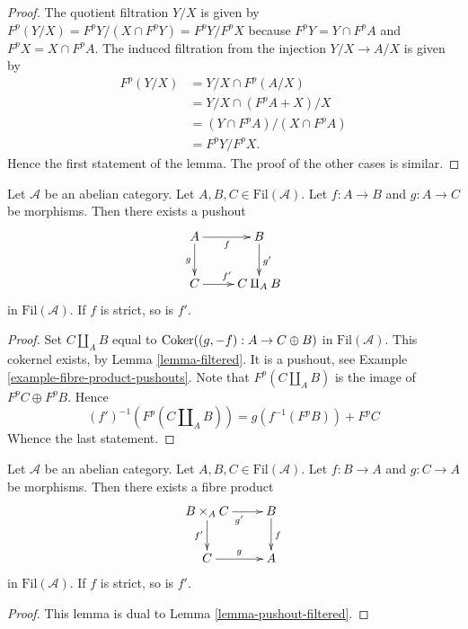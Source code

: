 \begin{proof}
The quotient filtration $Y/X$ is given by
$F^p(Y/X) = F^pY/(X \cap F^pY) = F^pY/F^pX$
because $F^pY = Y \cap F^pA$ and $F^pX = X \cap F^pA$.
The induced filtration from the injection $Y/X \to A/X$ is given by
\begin{align*}
F^p(Y/X) & = Y/X \cap F^p(A/X) \\
& = Y/X \cap (F^pA + X)/X \\
& = (Y \cap F^pA)/(X \cap F^pA) \\
& = F^pY/F^pX.
\end{align*}
Hence the first statement of the lemma.
The proof of the other cases is similar.
\end{proof}

\begin{lemma}
\label{lemma-pushout-filtered}
Let $\mathcal{A}$ be an abelian category.
Let $A, B, C \in \text{Fil}(\mathcal{A})$.
Let $f : A \to B$ and $g : A \to C$ be morphisms.
Then there exists a pushout
$$
\xymatrix{
A \ar[r]_f \ar[d]_g & B \ar[d]^{g'} \\
C \ar[r]^{f'} & C \amalg_A B
}
$$
in $\text{Fil}(\mathcal{A})$. If $f$ is strict, so is $f'$.
\end{lemma}

\begin{proof}
Set $C \amalg_A B$ equal to $\mathop{\mathrm{Coker}}((g, -f) : A \to C \oplus B)$
in $\text{Fil}(\mathcal{A})$. This cokernel exists, by
Lemma \ref{lemma-filtered}.
It is a pushout, see
Example \ref{example-fibre-product-pushouts}.
Note that $F^p(C \amalg_A B)$ is the image of $F^pC \oplus F^pB$.
Hence
$$
(f')^{-1}(F^p(C \amalg_A B)) = g(f^{-1}(F^pB)) + F^pC
$$
Whence the last statement.
\end{proof}

\begin{lemma}
\label{lemma-fibre-product-filtered}
Let $\mathcal{A}$ be an abelian category.
Let $A, B, C \in \text{Fil}(\mathcal{A})$.
Let $f : B \to A$ and $g : C \to A$ be morphisms.
Then there exists a fibre product
$$
\xymatrix{
B \times_A C \ar[r]_{g'} \ar[d]_{f'} & B \ar[d]^f \\
C \ar[r]^g & A
}
$$
in $\text{Fil}(\mathcal{A})$. If $f$ is strict, so is $f'$.
\end{lemma}

\begin{proof}
This lemma is dual to
Lemma \ref{lemma-pushout-filtered}.
\end{proof}

